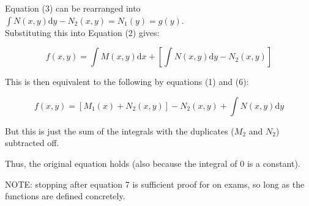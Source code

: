 \documentclass[12pt]{article}
\newcommand \dstyle \displaystyle
\renewcommand \d [1] {\mathrm{d}{#1}}
\newcommand \dx {{\d x}}
\newcommand \dy {{\d y}}
\begin{document}
Equation (3) can be rearranged into $\dstyle \int N(x, y) \dy - N_2(x, y) = N_1(y) = g(y)$.\\
Substituting this into Equation (2) gives:

\begin{equation}
	f(x, y) = \int M(x, y) \dx + \left[\int N(x, y) \dy - N_2(x, y)\right]
\end{equation}

This is then equivalent to the following by equations (1) and (6):

\begin{equation}
	f(x, y) = [M_1(x) + N_2(x, y)] - N_2(x, y) + \int N(x, y) \dy
\end{equation}

\newpage
\restoregeometry

But this is just the sum of the integrals with the duplicates ($M_2$ and $N_2$) subtracted off.

Thus, the original equation holds (also because the integral of $0$ is a constant).

\vspace{20px}

NOTE: stopping after equation 7 is sufficient proof for on exams, so long as the functions are defined concretely.
\end{document}
